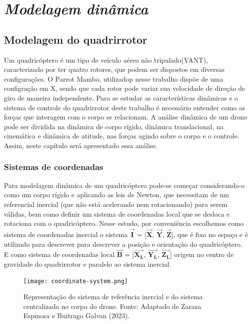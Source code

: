 \chapter{\textit{Modelagem dinâmica}}


\section{Modelagem do quadrirrotor}
Um quadricóptero é um tipo de veículo aéreo não tripulado(VANT), caracterizado por ter quatro rotores, que podem ser dispostos em diversas configurações. O Parrot Mambo, utilizadop nesse trabalho dispõe de uma configração em X, sendo que cada rotor pode variar sua velocidade de direção de giro de maneira independente.
Para se estudar as características dinâmicas e o sistema de controle do quadrirrotor deste trabalho é necessário entender como as forças que interagem com o corpo se relacionam. A análise dinâmica de um drone pode ser dividida na dinâmica de corpo rígido, dinâmica translacional, na cinemática e dinâmica de atitude, nas forças agindo sobre o corpo e o controle. Assim, neste capítulo será apresentado essa análise.

\subsection{Sistemas de coordenadas}

Para modelagem dinâmica de um quadricóptero pode-se começar considerando-o como um corpo rígido e aplicando as leis de Newton, que necessitam de um referencial inercial (que não está acelerando nem rotacionando) para serem válidas, bem como definir um sistema de coordenadas local que se desloca e rotaciona com o quadricóptero.
Nesse estudo, por conveniência escolhemos como sistema de coordenadas inercial o sistema $\boldsymbol{\vec{I}}$ = [$\boldsymbol{\vec{X}}$, $\boldsymbol{\vec{Y}}$, $\boldsymbol{\vec{Z}}$], que é fixo no espaço e é utilizado para descrever para descrever a posição e orientação do quadricóptero. E como sistema de coordenadas local $\boldsymbol{\vec{B}}$ = [$\boldsymbol{\vec{X_L}}$, $\boldsymbol{\vec{Y_L}}$, $\boldsymbol{\vec{Z_L}}$] origem no centro de gravidade do quadrirrotor e paralelo ao sistema inercial.

\begin{figure}[H]
	\centering
	\texttt{[image: coordinate-system.png]}
	\caption{Representação do sistema de referência inercial e do sistema centralizado no corpo do drone. Fonte: Adaptado de Zaraza Espinosa e Buitrago Galvan (2023).}
	\centering
	\label{fig:coordinate-system}
\end{figure}


